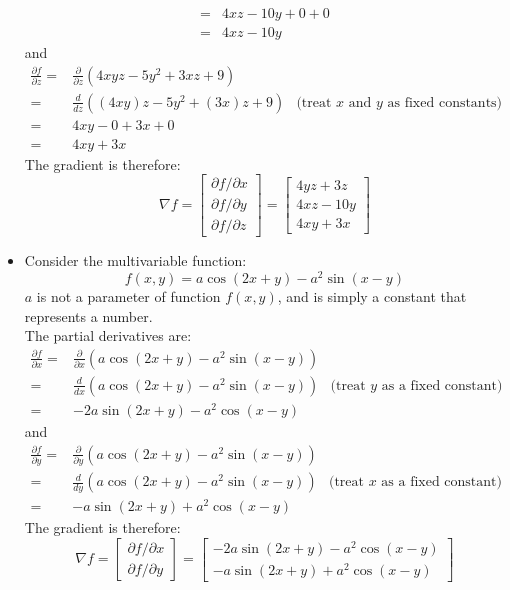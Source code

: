 \documentclass{article}
\begin{document}
\begin{itemize}
\begin{align*}
= & 4xz - 10y + 0 + 0 \\ 
= & 4xz - 10y 
\end{align*} 
and
\begin{align*}
\frac{\partial f}{\partial z} = & \frac{\partial}{\partial z}(4xyz - 5y^2 + 3xz + 9) \\ 
= & \frac{d}{dz}((4xy)z - 5y^2 + (3x)z + 9) & \text{(treat \(x\) and \(y\) as fixed constants)} \\ 
= & 4xy - 0 + 3x + 0 \\
= & 4xy + 3x
\end{align*} 
The gradient is therefore:
\[\nabla f = \begin{bmatrix}
\partial f/\partial x \\ 
\partial f/\partial y \\
\partial f/\partial z 
\end{bmatrix} = \begin{bmatrix}
4yz + 3z \\ 
4xz - 10y \\ 
4xy + 3x 
\end{bmatrix}\]
\item Consider the multivariable function:
\[f(x, y) = a\cos(2x + y) - a^2\sin(x - y)\]
\(a\) is not a parameter of function \(f(x, y)\), and is simply a constant that represents a number. \\
The partial derivatives are:
\begin{align*}
\frac{\partial f}{\partial x} = & \frac{\partial}{\partial x}(a\cos(2x + y) - a^2\sin(x - y)) \\ 
= & \frac{d}{dx}(a\cos(2x + y) - a^2\sin(x - y)) & \text{(treat \(y\) as a fixed constant)} \\ 
= & -2a\sin(2x + y) - a^2\cos(x - y)
\end{align*}
and 
\begin{align*}
\frac{\partial f}{\partial y} = & \frac{\partial}{\partial y}(a\cos(2x + y) - a^2\sin(x - y)) \\ 
= & \frac{d}{dy}(a\cos(2x + y) - a^2\sin(x - y)) & \text{(treat \(x\) as a fixed constant)} \\ 
= & -a\sin(2x + y) + a^2\cos(x - y)
\end{align*}
The gradient is therefore:
\[\nabla f = \begin{bmatrix}
\partial f/\partial x \\ 
\partial f/\partial y 
\end{bmatrix} = \begin{bmatrix}
-2a\sin(2x + y) - a^2\cos(x - y) \\
-a\sin(2x + y) + a^2\cos(x - y)
\end{bmatrix}\]
\end{itemize}
\end{document}
